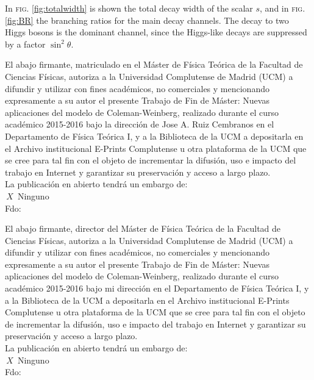 \documentclass[aps,prd,preprintnumbers,nofootinbibn,twocolumn]{revtex4}
\begin{document}
In \textsc{fig.} \ref{fig:totalwidth} is shown the total decay width of the scalar $s$, and in \textsc{fig.} \ref{fig:BR} the branching ratios for the main decay channels. The decay to two Higgs bosons is the dominant channel, since the Higgs-like decays are suppressed by a factor $\sin^2\theta$.



 

\newpage
\clearpage

\begin{widetext}
El abajo firmante, matriculado en el Máster de Física Teórica de la Facultad de Ciencias Físicas, autoriza a la Universidad Complutense de Madrid (UCM) a difundir y utilizar con fines académicos, no comerciales y mencionando expresamente a su autor el presente Trabajo de Fin de Máster: Nuevas aplicaciones del modelo de Coleman-Weinberg, realizado durante el curso académico 2015-2016 bajo la dirección de Jose A. Ruiz Cembranos en el Departamento de Física Teórica I, y a la Biblioteca de la UCM a depositarla en el Archivo institucional E-Prints Complutense u otra plataforma de la UCM que se cree para tal fin con el objeto de incrementar la difusión, uso e impacto del trabajo en Internet y garantizar su preservación y acceso a largo plazo.\\

La publicación en abierto tendrá un embargo de:
\\

\noindent$\,X\,$ Ninguno
\\


Fdo:\\


\vspace{3cm}

El abajo firmante, director del Máster de Física Teórica de la Facultad de Ciencias Físicas, autoriza a la Universidad Complutense de Madrid (UCM) a difundir y utilizar con fines académicos, no comerciales y mencionando expresamente a su autor el presente Trabajo de Fin de Máster: Nuevas aplicaciones del modelo de Coleman-Weinberg, realizado durante el curso académico 2015-2016 bajo mi dirección en el Departamento de Física Teórica I, y a la Biblioteca de la UCM a depositarla en el Archivo institucional E-Prints Complutense u otra plataforma de la UCM que se cree para tal fin con el objeto de incrementar la difusión, uso e impacto del trabajo en Internet y garantizar su preservación y acceso a largo plazo.\\

La publicación en abierto tendrá un embargo de:
\\

\noindent$\,X\,$ Ninguno
\\


Fdo:\\


\vspace{12cm}

\end{widetext}
\end{document}
